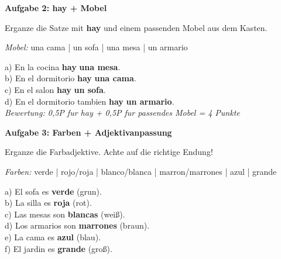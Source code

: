 \documentclass[11pt, a4paper]{article}
\newcommand{\fachfarbe}{spanisch}
\newcommand{\punktebox}[1]{\hfill\fbox{\small \_/#1}}
\newcommand{\loesung}[1]{\textcolor{loesung}{\textbf{#1}}}
\newenvironment{aufgabe}[1]{%
    \needspace{5\baselineskip}%
    \nopagebreak[4]%
    \vspace{10pt}
    \noindent\textbf{\textcolor{\fachfarbe}{Aufgabe #1}}
    \nopagebreak[4]%
    \vspace{5pt}
    \nopagebreak[4]%
    \begin{list}{}{\leftmargin=0pt}
    \item[]
}{%
    \end{list}
}
\newcommand{\es}[1]{\textcolor{\fachfarbe}{\textbf{#1}}}
\begin{document}
\begin{aufgabe}{2: hay + Mobel}
Erganze die Satze mit \es{hay} und einem passenden Mobel aus dem Kasten. \punktebox{4}
\end{aufgabe}

\begin{vokabelkasten}
\textit{Mobel:} una cama | un sofa | una mesa | un armario
\end{vokabelkasten}

\vspace{0.5em}

\noindent
a) En la cocina \loesung{hay} \loesung{una mesa}. \\[1em]
b) En el dormitorio \loesung{hay} \loesung{una cama}. \\[1em]
c) En el salon \loesung{hay} \loesung{un sofa}. \\[1em]
d) En el dormitorio tambien \loesung{hay} \loesung{un armario}. \\

\textit{\textcolor{grau}{Bewertung: 0,5P fur hay + 0,5P fur passendes Mobel = 4 Punkte}}

\vspace{15pt}


\begin{aufgabe}{3: Farben + Adjektivanpassung}
Erganze die Farbadjektive. Achte auf die richtige Endung! \punktebox{6}
\end{aufgabe}

\begin{vokabelkasten}
\textit{Farben:} verde | rojo/roja | blanco/blanca | marron/marrones | azul | grande
\end{vokabelkasten}

\vspace{0.5em}

\noindent
a) El sofa es \loesung{verde} (grun). \\[1em]
b) La silla es \loesung{roja} (rot). \\[1em]
c) Las mesas son \loesung{blancas} (weiß). \\[1em]
d) Los armarios son \loesung{marrones} (braun). \\[1em]
e) La cama es \loesung{azul} (blau). \\[1em]
f) El jardin es \loesung{grande} (groß). \\
\end{document}
